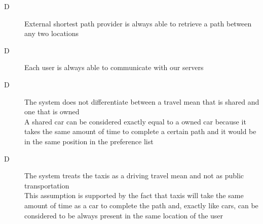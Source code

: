 \begin{description}
\item[D\thecountDom]  External shortest path provider is always able to retrieve a path between any two locations

\item[D\thecountDom] Each user is always able to communicate with our servers

\item[D\thecountDom] The system does not differentiate between a travel mean that is shared and one that is owned \\ [0.1cm]
A shared car can be considered exactly equal to a owned car because it takes the same amount of time to complete a certain path and it would be in the same position in the preference list
\normalsize

\item[D\thecountDom] The system treats the taxis as a driving travel mean and not as public transportation \\ [0.1cm]
This assumption is supported by the fact that taxis will take the same amount of time as a car to complete the path and, exactly like cars, can be considered to be always present in the same location of the user
\end{description}